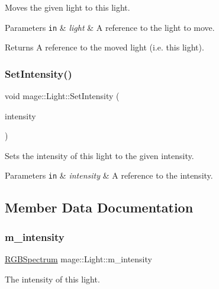Moves the given light to this light.


\begin{DoxyParams}[1]{Parameters}
\mbox{\tt in}  & {\em light} & A reference to the light to move. \\
\hline
\end{DoxyParams}
\begin{DoxyReturn}{Returns}
A reference to the moved light (i.\+e. this light). 
\end{DoxyReturn}
\hypertarget{classmage_1_1_light_ab7312aee7c5f7b4b564e27592e1b4223}{}\label{classmage_1_1_light_ab7312aee7c5f7b4b564e27592e1b4223} 
\subsubsection{\texorpdfstring{Set\+Intensity()}{SetIntensity()}}
{\footnotesize\ttfamily void mage\+::\+Light\+::\+Set\+Intensity (\begin{DoxyParamCaption}\item[{const \hyperlink{structmage_1_1_r_g_b_spectrum}{R\+G\+B\+Spectrum} \&}]{intensity }\end{DoxyParamCaption})\hspace{0.3cm}{\ttfamily [noexcept]}}

Sets the intensity of this light to the given intensity.


\begin{DoxyParams}[1]{Parameters}
\mbox{\tt in}  & {\em intensity} & A reference to the intensity. \\
\hline
\end{DoxyParams}


\subsection{Member Data Documentation}
\hypertarget{classmage_1_1_light_a4ed8d43c8a4df71671a922d5f04974b8}{}\label{classmage_1_1_light_a4ed8d43c8a4df71671a922d5f04974b8} 
\subsubsection{\texorpdfstring{m\+\_\+intensity}{m\_intensity}}
{\footnotesize\ttfamily \hyperlink{structmage_1_1_r_g_b_spectrum}{R\+G\+B\+Spectrum} mage\+::\+Light\+::m\+\_\+intensity\hspace{0.3cm}{\ttfamily [private]}}

The intensity of this light. 